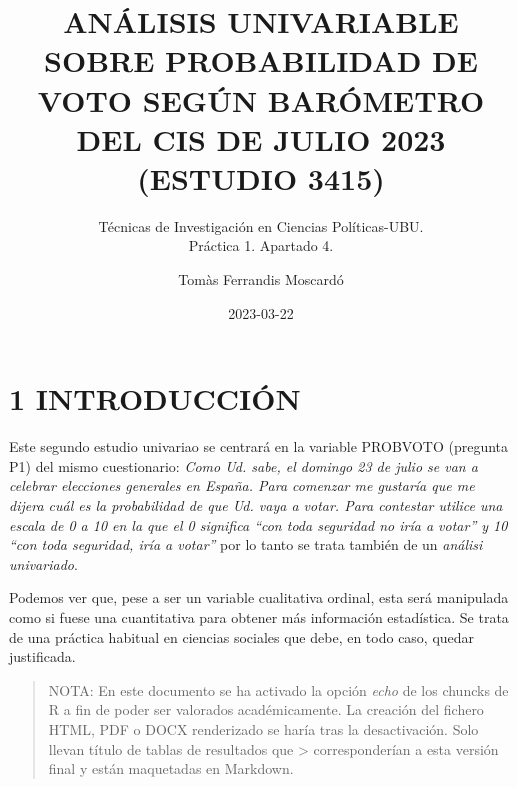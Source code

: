 \documentclass[
]{article}
\title{ANÁLISIS UNIVARIABLE SOBRE PROBABILIDAD DE VOTO SEGÚN BARÓMETRO
DEL CIS DE JULIO 2023\\
(ESTUDIO 3415)}
\subtitle{Técnicas de Investigación en Ciencias Políticas-UBU.\\
Práctica 1. Apartado 4.}
\author{Tomàs Ferrandis Moscardó}
\date{2023-03-22}
\begin{document}
\maketitle

{
\setcounter{tocdepth}{2}
\tableofcontents
}
\newpage

\hypertarget{introducciuxf3n}{%
\section{1 INTRODUCCIÓN}\label{introducciuxf3n}}

Este segundo estudio univariao se centrará en la variable PROBVOTO
(pregunta P1) del mismo cuestionario: \emph{Como Ud. sabe, el domingo 23
de julio se van a celebrar elecciones generales en España. Para comenzar
me gustaría que me dijera cuál es la probabilidad de que Ud. vaya a
votar. Para contestar utilice una escala de 0 a 10 en la que el 0
significa ``con toda seguridad no iría a votar'' y 10 ``con toda
seguridad, iría a votar''} por lo tanto se trata también de un
\emph{análisi univariado}.

Podemos ver que, pese a ser un variable cualitativa ordinal, esta será
manipulada como si fuese una cuantitativa para obtener más información
estadística. Se trata de una práctica habitual en ciencias sociales que
debe, en todo caso, quedar justificada.

\begin{quote}
NOTA: En este documento se ha activado la opción \emph{echo} de los
chuncks de R a fin de poder ser valorados académicamente. La creación
del fichero HTML, PDF o DOCX renderizado se haría tras la desactivación.
Solo llevan título de tablas de resultados que \textgreater{}
corresponderían a esta versión final y están maquetadas en Markdown.
\end{quote}
\end{document}
